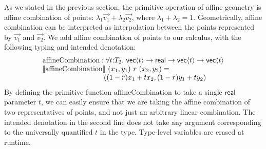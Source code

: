 As we stated in the previous section, the primitive operation of
affine geometry is affine combination of points: $\lambda_1\vec{v_1} +
\lambda_2\vec{v_2}$, where $\lambda_1 + \lambda_2 = 1$. Geometrically,
affine combination can be interpreted as interpolation between the
points represented by $\vec{v_1}$ and $\vec{v_2}$. We add affine
combination of points to our calculus, with the following typing and
intended denotation:
\begin{displaymath}
  \begin{array}{l}
    \mathrm{affineCombination} :\forall t \mathord: T_2.\ \mathsf{vec}\langle t \rangle \to \mathsf{real} \to \mathsf{vec}\langle t \rangle \to \mathsf{vec}\langle t \rangle \\
    \sem{\mathrm{affineCombination}}\ (x_1,y_1)\ r\ (x_2,y_2) = \\
    \hspace{3cm}((1-r)x_1 + tx_2, (1-r)y_1 + ty_2)
  \end{array}
\end{displaymath}
By defining the primitive function $\mathrm{affineCombination}$ to
take a single $\mathsf{real}$ parameter $t$, we can easily ensure that
we are taking the affine combination of two representatives of points,
and not just an arbitrary linear combination. The intended denotation
in the second line does not take any argument corresponding to the
universally quantified $t$ in the type. Type-level variables are
erased at runtime.


